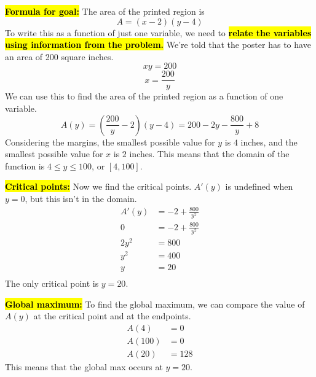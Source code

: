 \documentclass{article}
\newcommand{\highlight}[1]{\boldmath\hl{\textbf{#1}}\unboldmath}
\begin{document}
\begin{enumerate}
\begin{solution}
    
    \highlight{Formula for goal:} The area of the printed region is 
      $$A = (x-2)(y-4)$$
      To write this as a function of just one variable, we need to \highlight{relate the
      variables using information from the problem.} We're told that the poster has to have an area of 200 square inches. 
      $$xy=200$$
      $$ x = \frac{200}{y}$$
      We can use this to find the area of the printed region as a function of one variable.
      $$A(y) = \left( \frac{200}{y} -2\right ) (y-4) = 200 -2y -\frac{800}{y} +8$$ 
      Considering the margins, the smallest possible value for $y$ is $4$ inches, and
      the smallest possible value for $x$ is $2$ inches. This means that the domain of
      the function is $4 \leq y \leq 100$, or $[4, 100]$.

      \highlight{Critical points:}
      Now we find the critical points. $A'(y)$ is undefined when $y=0$, but this
      isn't in the domain.
      \begin{align*}
      A'(y) &=-2 +\frac{800}{y^2} \\
      0 &= -2 +\frac{800}{y^2} \\
      2y^2 &= 800 \\
      y^2 &= 400 \\
      y &= 20 \\
      \end{align*}
      The only critical point is $y=20$.

      \highlight{Global maximum:} To find the global maximum, we can compare
      the value of $A(y)$ at the critical point and at the endpoints.
      \begin{align*}
      A(4) &= 0  \\
      A(100) &= 0 \\
      A(20) &= 128
      \end{align*}
      This means that the global max occurs at $y=20$. 


\end{solution}
\end{enumerate}
\end{document}

